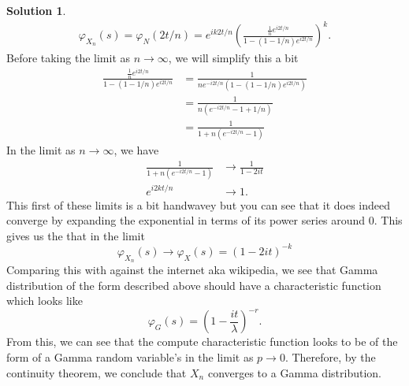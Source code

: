 \documentclass[12pt]{article}
\renewcommand{\phi}{\varphi}
\theoremstyle{definition}
\newtheorem{sol}{Solution}
\theoremstyle{remark}
\begin{document}
\begin{sol}
\begin{align*}
    \phi_{X_{n}}(s) = \phi_{N}(2 t /n) =   e^{ik 2 t / n} \left(\frac{ \frac{1}{n} e^{i2 t / n}}{1 - (1- 1 / n )e^{i2 t / n}}  \right)^{k}.
\end{align*}
Before taking the limit as $n\to \infty$, we will simplify this a bit
\begin{align*}
\frac{ \frac{1}{n} e^{i2 t / n}}{1 - (1- 1 / n )e^{i2 t / n}} 
&=
\frac{1}{n e^{- i2 t / n} ( 1 - (1 - 1/ n) e^{i2 t / n} )} \\
&=
\frac{1}{n(e^{-i2 t / n} - 1 + 1 / n)} \\
&= \frac{1}{1 +  n (e^{-i2 t / n} -1) }
\end{align*}
In the limit as $n\to \infty$, we have 
\begin{align*}
    \frac{1}{1 +  n (e^{-i2 t / n} -1) } &\to  \frac{1}{1 - 2it}\\
e^{i2k t / n} &\to 1.
\end{align*}
This first of these limits is a bit handwavey but you can see that it does indeed converge by expanding the exponential in terms of its power series around 0. This gives us the that in the limit
\begin{equation*}
    \phi_{X_{n}}(s) \to \phi_{X}(s) = (1 - 2it)^{-k}
\end{equation*}
Comparing this with against the internet aka wikipedia, we see that Gamma distribution of the form described above should have a characteristic function which looks like
\begin{equation*}
    \phi_{G}(s) = (1 - \frac{it}{\lambda})^{-r}.
\end{equation*}
From this, we can see that the compute characteristic function looks to be of the form of a Gamma random variable's in the limit as $p \to 0$. Therefore, by the continuity theorem, we conclude that $X_{n}$ converges to a Gamma distribution.
\end{sol}

\end{document}
